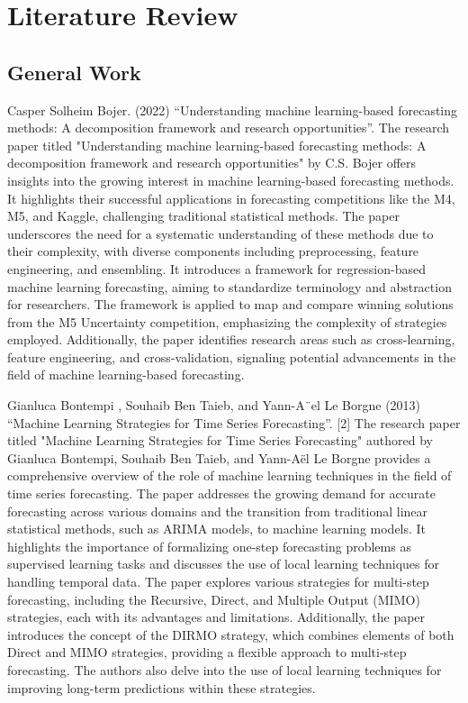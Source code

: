 \section{Literature Review}
    \subsection{General Work}
        Casper Solheim Bojer. (2022) “Understanding machine learning-based forecasting methods: A decomposition framework and research opportunities”\cite{bojer}. The research paper titled "Understanding machine learning-based forecasting methods: A decomposition framework and research opportunities" by C.S. Bojer offers insights into the growing interest in machine learning-based forecasting methods. It highlights their successful applications in forecasting competitions like the M4, M5, and Kaggle, challenging traditional statistical methods. The paper underscores the need for a systematic understanding of these methods due to their complexity, with diverse components including preprocessing, feature engineering, and ensembling. It introduces a framework for regression-based machine learning forecasting, aiming to standardize terminology and abstraction for researchers. The framework is applied to map and compare winning solutions from the M5 Uncertainty competition, emphasizing the complexity of strategies employed. Additionally, the paper identifies research areas such as cross-learning, feature engineering, and cross-validation, signaling potential advancements in the field of machine learning-based forecasting.
        
        Gianluca Bontempi , Souhaib Ben Taieb, and Yann-A¨el Le Borgne (2013) “Machine Learning Strategies for Time Series Forecasting”. [2] The research paper titled "Machine Learning Strategies for Time Series Forecasting" authored by Gianluca Bontempi, Souhaib Ben Taieb, and Yann-Aël Le Borgne provides a comprehensive overview of the role of machine learning techniques in the field of time series forecasting. The paper addresses the growing demand for accurate forecasting across various domains and the transition from traditional linear statistical methods, such as ARIMA models, to machine learning models. It highlights the importance of formalizing one-step forecasting problems as supervised learning tasks and discusses the use of local learning techniques for handling temporal data. The paper explores various strategies for multi-step forecasting, including the Recursive, Direct, and Multiple Output (MIMO) strategies, each with its advantages and limitations. Additionally, the paper introduces the concept of the DIRMO strategy, which combines elements of both Direct and MIMO strategies, providing a flexible approach to multi-step forecasting. The authors also delve into the use of local learning techniques for improving long-term predictions within these strategies.
        
